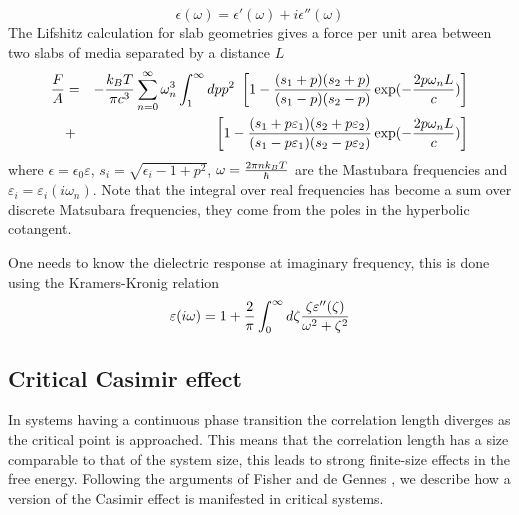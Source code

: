 \begin{equation}
\epsilon(\omega) = \epsilon'(\omega)+i\epsilon''(\omega)
\end{equation}
The Lifshitz calculation for slab geometries gives a force per unit area between two slabs of media separated by a distance $L$
\begin{eqnarray}
{F\over A} &=& -{k_BT \over \pi c^3}\sum_{n=0}^\infty \omega_n^3 \int_1^\infty dp p^2 \ 
\left[ 1-{(s_1+p)(s_2+p)\over (s_1-p)(s_2-p)}\exp(-{2p\omega_n L\over c})\right]\nonumber \\
&+&\left[ 1-{(s_1+p\varepsilon_1)(s_2+p\varepsilon_2)\over (s_1-p\varepsilon_1)(s_2-p\varepsilon_2)}\exp(-{2p\omega_n L\over c})\right]
\end{eqnarray}
where $\epsilon = \epsilon_0\varepsilon$, $s_i = \sqrt{\epsilon_i -1 +p^2}$,
$\omega = {2\pi nk_BT \over \hbar}$ are the Mastubara frequencies \cite{matsubara_new_1955} and ${\varepsilon_i
=\varepsilon_i(i\omega_n)}$. Note that the integral over real frequencies has become a sum over discrete Matsubara frequencies, they come from the poles in the hyperbolic cotangent.

One needs to know the dielectric response at imaginary frequency, this is done using the Kramers-Kronig relation
\begin{equation}
\varepsilon(i\omega)= 1 +{2\over \pi}\int_0^\infty d\zeta {\zeta \varepsilon''(\zeta)\over \omega^2 + \zeta^2}
\end{equation}


\subsection{Critical Casimir effect}


In systems having a continuous phase transition the correlation length diverges as the critical point is approached. This means that the correlation length has a size comparable to that of the system size, this  leads to strong finite-size effects in the free energy. Following the arguments of Fisher and de Gennes \cite{gambassi_casimir_2009}, we describe how a version of  the Casimir effect is manifested in  critical systems. 

